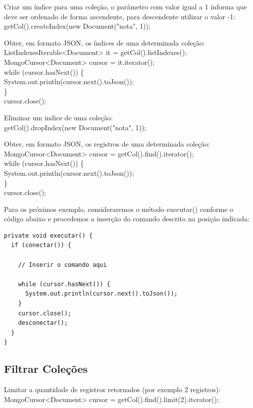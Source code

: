\documentclass[a4paper,11pt]{article}
\begin{document}
Criar um índice para uma coleção, o parâmetro com valor igual a 1 informa que deve ser ordenado de forma ascendente, para descendente utilizar o valor -1: \\
{\ttfamily getCol().createIndex(new Document("nota", 1));}

Obter, em formato JSON, os índices de uma determinada coleção: \\
{\ttfamily ListIndexesIterable<Document> it = getCol().listIndexes(); \\
MongoCursor<Document> cursor = it.iterator(); \\
while (cursor.hasNext()) \{ \\
\phantom{x}\hspace{4pt} System.out.println(cursor.next().toJson()); \\
\} \\
cursor.close();}

Eliminar um indice de uma coleção: \\
{\ttfamily getCol().dropIndex(new Document("nota", 1));}

Obter, em formato JSON, os registros de uma determinada coleção: \\
{\ttfamily MongoCursor<Document> cursor = getCol().find().iterator(); \\
while (cursor.hasNext()) \{ \\
\phantom{x}\hspace{4pt} System.out.println(cursor.next().toJson()); \\
\} \\
cursor.close();}

Para os próximos exemplo, consideraremos o método executar() conforme o código abaixo e procedemos a inserção do comando descrito na posição indicada:
\begin{lstlisting}
private void executar() {
  if (conectar()) {

    // Inserir o comando aqui
    
    while (cursor.hasNext()) {
      System.out.println(cursor.next().toJson());
    }
    cursor.close();  
    desconectar();
  }
}
\end{lstlisting}

\subsection{Filtrar Coleções}
Limitar a quantidade de registros retornados (por exemplo 2 registros): \\
{\ttfamily MongoCursor<Document> cursor = getCol().find().limit(2).iterator();}
\end{document}
